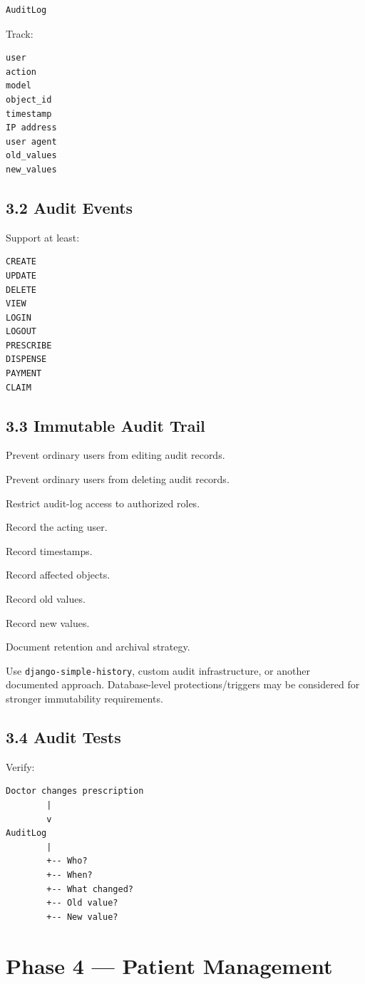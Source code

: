 \documentclass[11pt,a4paper]{article}
\newcommand{\task}[1]{\item[$\square$] #1}
\begin{document}
\begin{lstlisting}
AuditLog
\end{lstlisting}

Track:

\begin{lstlisting}
user
action
model
object_id
timestamp
IP address
user agent
old_values
new_values
\end{lstlisting}

\subsection{3.2 Audit Events}

Support at least:

\begin{lstlisting}
CREATE
UPDATE
DELETE
VIEW
LOGIN
LOGOUT
PRESCRIBE
DISPENSE
PAYMENT
CLAIM
\end{lstlisting}

\subsection{3.3 Immutable Audit Trail}

\task{Prevent ordinary users from editing audit records.}
\task{Prevent ordinary users from deleting audit records.}
\task{Restrict audit-log access to authorized roles.}
\task{Record the acting user.}
\task{Record timestamps.}
\task{Record affected objects.}
\task{Record old values.}
\task{Record new values.}
\task{Document retention and archival strategy.}

Use \texttt{django-simple-history}, custom audit infrastructure, or another
documented approach. Database-level protections/triggers may be considered
for stronger immutability requirements.

\subsection{3.4 Audit Tests}

Verify:

\begin{lstlisting}
Doctor changes prescription
        |
        v
AuditLog
        |
        +-- Who?
        +-- When?
        +-- What changed?
        +-- Old value?
        +-- New value?
\end{lstlisting}

\section{Phase 4 --- Patient Management}
\end{document}
